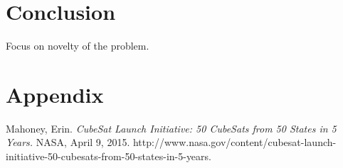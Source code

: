 \documentclass[]{aiaa-tc}%
\begin{document}
\section{Conclusion}
Focus on novelty of the problem.

\section{Appendix}


\begin{thebibliography}{9}%
Mahoney, Erin. {\it CubeSat Launch Initiative: 50 CubeSats from 50 States in 5 Years.} NASA, April 9, 2015. http://www.nasa.gov/content/cubesat-launch-initiative-50-cubesats-from-50-states-in-5-years.\\


\end{thebibliography}
\end{document}
